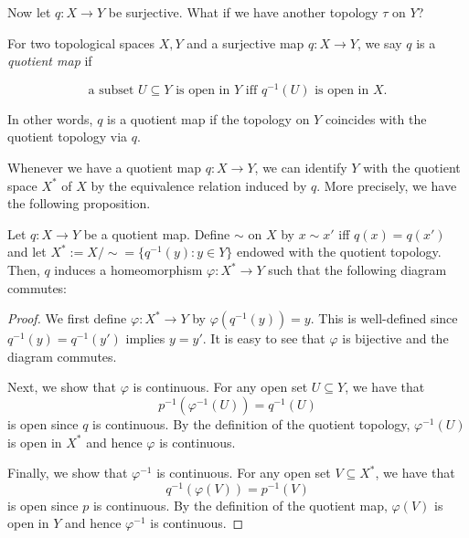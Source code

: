 \newpage

Now let $q:X\to Y$ be surjective. What if we have another topology $\tau$ on $Y$?

\begin{definition}
  For two topological spaces $X,Y$ and a surjective map $q:X\to Y$, we say $q$ is a \emph{quotient map} if 

  \[\text{a subset $U \subseteq Y$ is open in $Y$ iff $q^{-1}(U)$ is open in $X$.}\]
\end{definition}

In other words, $q$ is a quotient map if the topology on $Y$ coincides with the quotient topology via $q$. 

Whenever we have a quotient map $q:X\to Y$, we can identify $Y$ with the quotient space $X^*$ of $X$ by the equivalence relation induced by $q$. More precisely, we have the following proposition.

\begin{proposition}
  Let $q:X\to Y$ be a quotient map. Define $\sim$ on $X$ by $x\sim x'$ iff $q(x)=q(x')$ and let $X^*:=X/\sim=\{q^{-1}(y): y \in Y\}$ endowed with the quotient topology. Then, $q$ induces a homeomorphism $\varphi:X^*\to Y$ such that the following diagram commutes:
  \begin{center}
  \end{center}
\end{proposition}
\begin{proof}
  We first define $\varphi:X^*\to Y$ by $\varphi(q^{-1}(y))=y$. This is well-defined since $q^{-1}(y)=q^{-1}(y')$ implies $y=y'$. It is easy to see that $\varphi$ is bijective and the diagram commutes.

  Next, we show that $\varphi$ is continuous. For any open set $U\subseteq Y$, we have that
  \[p^{-1}(\varphi^{-1}(U))=q^{-1}(U)\]
is open since $q$ is continuous. By the definition of the quotient topology, $\varphi^{-1}(U)$ is open in $X^*$ and hence $\varphi$ is continuous.

Finally, we show that $\varphi^{-1}$ is continuous. For any open set $V\subseteq X^*$, we have that
\[q^{-1}(\varphi(V))=p^{-1}(V)\]
is open since $p$ is continuous. By the definition of the quotient map, $\varphi(V)$ is open in $Y$ and hence $\varphi^{-1}$ is continuous.
\end{proof}


